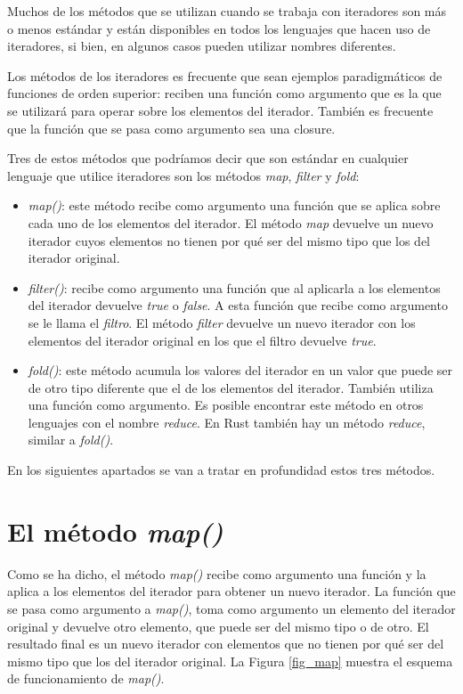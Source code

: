 Muchos de los métodos que se utilizan cuando se trabaja con iteradores son más o menos estándar y están disponibles en todos los lenguajes que hacen uso de iteradores, si bien, en algunos casos pueden utilizar nombres diferentes. 

Los métodos de los iteradores es frecuente que sean ejemplos paradigmáticos de funciones de orden superior: reciben una función como argumento que es la que se utilizará para operar sobre los elementos del iterador. También es frecuente que la función que se pasa como argumento sea una closure.

Tres de estos métodos que podríamos decir que son estándar en cualquier lenguaje que utilice iteradores son los métodos \textit{map}, \textit{filter} y \textit{fold}:

\begin{itemize}
   \item \textit{map()}: este método recibe como argumento una función que se aplica sobre cada uno de los elementos del iterador. El método \textit{map} devuelve un nuevo iterador cuyos elementos no tienen por qué ser del mismo tipo que los del iterador original.
   \item \textit{filter()}: recibe como argumento una función que al aplicarla a los elementos del iterador devuelve \textit{true} o \textit{false}. A esta función que recibe como argumento se le llama el \textit{filtro}. El método \textit{filter} devuelve un nuevo iterador con los elementos del iterador original en los que el filtro devuelve \textit{true}.
   \item \textit{fold()}: este método acumula los valores del iterador en un valor que puede ser de otro tipo diferente que el de los elementos del iterador. También utiliza una función como argumento. Es posible encontrar este método en otros lenguajes con el nombre \textit{reduce}. En Rust también hay un método \textit{reduce}, similar a \textit{fold()}. 
\end{itemize}

   
En los siguientes apartados se van a tratar en profundidad estos tres métodos.
   
\section{El método \textit{map()}}
Como se ha dicho, el método \textit{map()} recibe como argumento una función y la aplica a los elementos del iterador para obtener un nuevo iterador. La función que se pasa como argumento a \textit{map()}, toma como argumento un elemento del iterador original y devuelve otro elemento, que puede ser del mismo tipo o de otro. El resultado final es un nuevo iterador con elementos que no tienen por qué ser del mismo tipo que los del iterador original. La Figura \ref{fig_map} muestra el esquema de funcionamiento de \textit{map()}.

